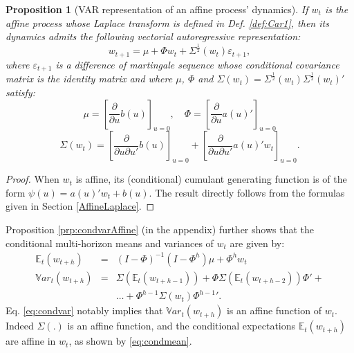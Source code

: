 \documentclass[
  12pt,
]{book}
\newtheorem{proposition}{Proposition}[chapter]
\theoremstyle{definition}
\theoremstyle{definition}
\theoremstyle{definition}
\theoremstyle{definition}
\theoremstyle{remark}
\begin{document}
\begin{proposition}[VAR representation of an affine process' dynamics]
\protect\hypertarget{prp:affineVAR}{}\label{prp:affineVAR}If \(w_t\) is the affine process whose Laplace transform is defined in Def. \ref{def:Car1}, then its dynamics admits the following vectorial autoregressive representation:
\begin{equation}
w_{t+1} = \mu + \Phi w_{t} + \Sigma^{\frac{1}{2}}(w_t) \varepsilon_{t+1},\label{eq:VARw}
\end{equation}
where \(\varepsilon_{t+1}\) is a difference of martingale sequence whose conditional covariance matrix is the identity matrix and where \(\mu\), \(\Phi\) and \(\Sigma(w_t) = \Sigma^{\frac{1}{2}}(w_t){\Sigma^{\frac{1}{2}}(w_t)}'\) satisfy:
\begin{equation}
\mu =  \left[\frac{\partial }{\partial u}b(u)\right]_{u=0}, \quad \Phi= \left[\frac{\partial }{\partial u}a(u)'\right]_{u=0}\label{eq:MUPHI}
\end{equation}
\begin{equation}
\Sigma(w_t) =  \left[\frac{\partial }{\partial u\partial u'}b(u)\right]_{u=0} + \left[\frac{\partial }{\partial u\partial u'}a(u)'w_t\right]_{u=0}.\label{eq:SigmaWt}
\end{equation}
\end{proposition}

\begin{proof}
When \(w_t\) is affine, its (conditional) cumulant generating function is of the form \(\psi(u)=a(u)'w_t+b(u)\). The result directly follows from the formulas given in Section \ref{AffineLaplace}.
\end{proof}

Proposition \ref{prp:condvarAffine} (in the appendix) further shows that the conditional multi-horizon means and variances of \(w_t\) are given by:
\begin{eqnarray}
\mathbb{E}_t(w_{t+h}) &=& (I - \Phi)^{-1}(I - \Phi^h)\mu + \Phi^h w_t \label{eq:condmean}\\
\mathbb{V}ar_t(w_{t+h}) &=& \Sigma(\mathbb{E}_t(w_{t+h-1}))+\Phi \Sigma(\mathbb{E}_t(w_{t+h-2}))\Phi' + \nonumber \\
&& \dots + \Phi^{h-1} \Sigma(w_{t}){\Phi^{h-1}}'. \label{eq:condvar}
\end{eqnarray}
Eq. \eqref{eq:condvar} notably implies that \(\mathbb{V}ar_t(w_{t+h})\) is an affine function of \(w_t\). Indeed \(\Sigma(.)\) is an affine function, and the conditional expectations \(\mathbb{E}_t(w_{t+h})\) are affine in \(w_t\), as shown by \eqref{eq:condmean}.
\end{document}
